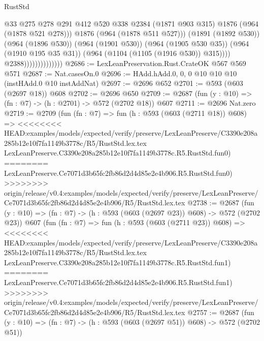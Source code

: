 \begin{lexlean}{RustStd}
\begin{coremodule}
{\begin{coremodule}
{{{{{{{{{                                        @33
                                        @275
                                        @278
                                        @291
                                        @412
                                        @520
                                        @338
                                        @2384
                                        (@1871 @903 @315)
                                        @1876
                                        (@964 (@1878 @521 @278)))
                                      @1876
                                      (@964 (@1878 @511 @527)))
                                    (@1891 (@1892 @530))
                                    (@964 (@1896 @530))
                                    (@964 (@1901 @530))
                                    (@964 (@1905 @530 @35))
                                    (@964 (@1910 @195 @35 @31))
                                    (@964 (@1104 (@1105 (@1916 @530)) @315))))
                                @2388))))))))))))))
@2686 := LexLeanPreservation.Rust.CrateOK @567 @569 @571
@2687 := Nat.casesOn.{0}
@2696 := HAdd.hAdd.{0, 0, 0} @10 @10 @10 (instHAdd.{0} @10 instAddNat)
@2697 := @2696 @652
@2701 := @593 (@603 (@2697 @18)) @608
@2702 := @2696 @650
@2709 := @2687 (fun (y : @10) => (fn : @7) -> (h : @2701) -> @572 (@2702 @18)) @607
@2711 := @2696 Nat.zero
@2719 := @2709
    (fun (fn : @7) =>
    fun (h : @593 (@603 (@2711 @18)) @608) =>
<<<<<<<< HEAD:examples/models/expected/verify/preserve/LexLeanPreserve/C3390e208a285b12e10f7fa1149b3778c/R5/RustStd.lex.tex
    LexLeanPreserve.C3390e208a285b12e10f7fa1149b3778c.R5.RustStd.fun0)
========
    LexLeanPreserve.Ce7071d3b65fc2fb86d2d4d85e2e4b906.R5.RustStd.fun0)
>>>>>>>> origin/release/v0.4:examples/models/expected/verify/preserve/LexLeanPreserve/Ce7071d3b65fc2fb86d2d4d85e2e4b906/R5/RustStd.lex.tex
@2738 := @2687
    (fun (y : @10) => (fn : @7) -> (h : @593 (@603 (@2697 @23)) @608) -> @572 (@2702 @23))
    @607
    (fun (fn : @7) =>
    fun (h : @593 (@603 (@2711 @23)) @608) =>
<<<<<<<< HEAD:examples/models/expected/verify/preserve/LexLeanPreserve/C3390e208a285b12e10f7fa1149b3778c/R5/RustStd.lex.tex
    LexLeanPreserve.C3390e208a285b12e10f7fa1149b3778c.R5.RustStd.fun1)
========
    LexLeanPreserve.Ce7071d3b65fc2fb86d2d4d85e2e4b906.R5.RustStd.fun1)
>>>>>>>> origin/release/v0.4:examples/models/expected/verify/preserve/LexLeanPreserve/Ce7071d3b65fc2fb86d2d4d85e2e4b906/R5/RustStd.lex.tex
@2757 := @2687
    (fun (y : @10) => (fn : @7) -> (h : @593 (@603 (@2697 @51)) @608) -> @572 (@2702 @51))
}}}}}}}}}
\end{coremodule}}
\end{coremodule}
\end{lexlean}
